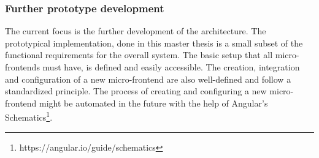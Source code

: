 \subsubsection{Further prototype development}

The current focus is the further development of the architecture. The prototypical implementation, done in this master thesis is a small subset of the functional requirements for the overall system. The basic setup that all micro-frontends must have, is defined and easily accessible. The creation, integration and configuration of a new micro-frontend are also well-defined and follow a standardized principle. The process of creating and configuring a new micro-frontend might be automated in the future with the help of Angular's Schematics\footnote[1]{https://angular.io/guide/schematics}.







